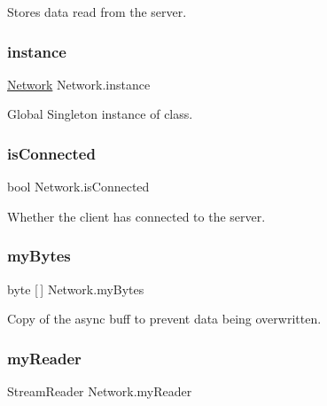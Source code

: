 Stores data read from the server. 

\mbox{\label{class_network_af63d25c25873f9220c94d6250a1c9242}} 
\subsubsection{\texorpdfstring{instance}{instance}}
{\footnotesize\ttfamily \mbox{\hyperlink{class_network}{Network}} Network.\+instance\hspace{0.3cm}{\ttfamily [static]}}



Global Singleton instance of class. 

\mbox{\label{class_network_a52a8a42e75c5dea2078f8a20a4293607}} 
\subsubsection{\texorpdfstring{isConnected}{isConnected}}
{\footnotesize\ttfamily bool Network.\+is\+Connected}



Whether the client has connected to the server. 

\mbox{\label{class_network_af6127d2e2616cfd231e2456e995e334a}} 
\subsubsection{\texorpdfstring{myBytes}{myBytes}}
{\footnotesize\ttfamily byte \mbox{[}$\,$\mbox{]} Network.\+my\+Bytes\hspace{0.3cm}{\ttfamily [private]}}



Copy of the async buff to prevent data being overwritten. 

\mbox{\label{class_network_ae8836ce514687bd3c43e16aad880d248}} 
\subsubsection{\texorpdfstring{myReader}{myReader}}
{\footnotesize\ttfamily Stream\+Reader Network.\+my\+Reader}



